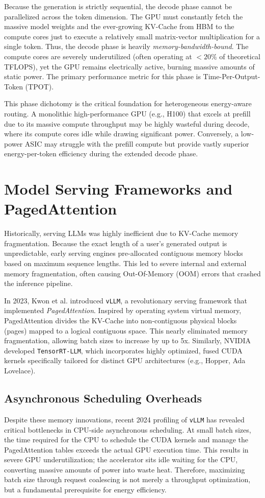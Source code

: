 \documentclass[12pt,a4paper,oneside]{report}
\begin{document}
Because the generation is strictly sequential, the decode phase cannot be parallelized across the token dimension. The GPU must constantly fetch the massive model weights and the ever-growing KV-Cache from HBM to the compute cores just to execute a relatively small matrix-vector multiplication for a single token. Thus, the decode phase is heavily \textit{memory-bandwidth-bound}. The compute cores are severely underutilized (often operating at $<20\%$ of theoretical TFLOPS), yet the GPU remains electrically active, burning massive amounts of static power. The primary performance metric for this phase is Time-Per-Output-Token (TPOT).

This phase dichotomy is the critical foundation for heterogeneous energy-aware routing.
A monolithic high-performance GPU (e.g., H100) that excels at prefill due to its
massive compute throughput may be highly wasteful during decode, where its compute
cores idle while drawing significant power. Conversely, a low-power ASIC may struggle
with the prefill compute but provide vastly superior energy-per-token efficiency during
the extended decode phase.


\section{Model Serving Frameworks and PagedAttention}
\label{sec:lit_serving_frameworks}

Historically, serving LLMs was highly inefficient due to KV-Cache memory fragmentation. Because the exact length of a user's generated output is unpredictable, early serving engines pre-allocated contiguous memory blocks based on maximum sequence lengths. This led to severe internal and external memory fragmentation, often causing Out-Of-Memory (OOM) errors that crashed the inference pipeline.

In 2023, Kwon et al. introduced \texttt{vLLM}, a revolutionary serving framework that implemented \textit{PagedAttention}. Inspired by operating system virtual memory, PagedAttention divides the KV-Cache into non-contiguous physical blocks (pages) mapped to a logical contiguous space. This nearly eliminated memory fragmentation, allowing batch sizes to increase by up to 5x. Similarly, NVIDIA developed \texttt{TensorRT-LLM}, which incorporates highly optimized, fused CUDA kernels specifically tailored for distinct GPU architectures (e.g., Hopper, Ada Lovelace).

\subsection{Asynchronous Scheduling Overheads}
Despite these memory innovations, recent 2024 profiling of \texttt{vLLM} has revealed critical bottlenecks in CPU-side asynchronous scheduling. At small batch sizes, the time required for the CPU to schedule the CUDA kernels and manage the PagedAttention tables exceeds the actual GPU execution time. This results in severe GPU underutilization; the accelerator sits idle waiting for the CPU, converting massive amounts of power into waste heat. Therefore, maximizing batch size through request coalescing is not merely a throughput optimization, but a fundamental prerequisite for energy efficiency.
\end{document}
